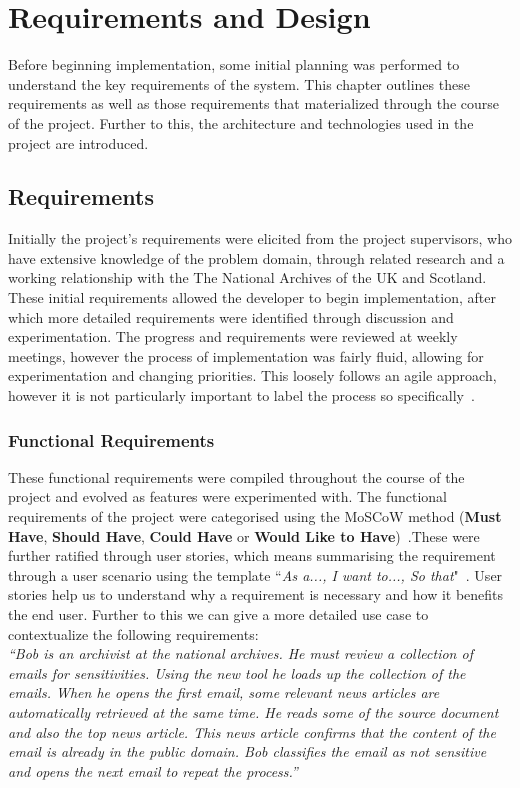 \documentclass{l4proj}
\begin{document}
\chapter{Requirements and Design} \label{requirementsanddesign}
Before beginning implementation, some initial planning was performed to understand the key requirements of the system. This chapter outlines these requirements as well as those requirements that materialized through the course of the project. Further to this, the architecture and technologies used in the project are introduced.
\section{Requirements}
Initially the project's requirements were elicited from the project supervisors, who have extensive knowledge of the problem domain, through related research and a working relationship with the The National Archives of the UK and Scotland.
These initial requirements allowed the developer to begin implementation, after which more detailed requirements were identified through discussion and experimentation. The progress and requirements were reviewed at weekly meetings, however the process of implementation was fairly fluid, allowing for experimentation and changing priorities. This loosely follows an agile approach, however it is not particularly important to label the process so specifically~\cite{Sommerville:2010:SE:1841764}.

\subsection{Functional Requirements}
These functional requirements were compiled throughout the course of the project and evolved as features were experimented with.
The functional requirements of the project were categorised using the MoSCoW method (\textbf{Must Have}, \textbf{Should Have}, \textbf{Could Have} or \textbf{Would Like to Have})~\cite{storer_lecture_2014}.These were further ratified through user stories, which means summarising the requirement through a user scenario using the template ``\textit{As a..., I want to..., So that}"~\cite{storer_lecture_2014}. User stories help us to understand why a requirement is necessary and how it benefits the end user. Further to this we can give a more detailed use case to contextualize the following requirements:\\ 
\textit{``Bob is an archivist at the national archives. He must review a collection of emails for sensitivities. Using the new tool he loads up the collection of the emails. When he opens the first email, some relevant news articles are automatically retrieved at the same time. He reads some of the source document and also the top news article. This news article confirms that the content of the email is already in the public domain. Bob classifies the email as not sensitive and opens the next email to repeat the process.''}
\end{document}
